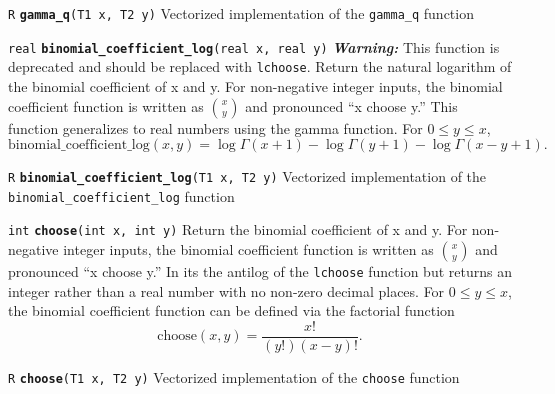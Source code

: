 \documentclass[
  10pt,
]{book}
\begin{document}

\texttt{R} \textbf{\texttt{gamma\_q}}\texttt{(T1\ x,\ T2\ y)}\newline
Vectorized implementation of the \texttt{gamma\_q} function


\texttt{real} \textbf{\texttt{binomial\_coefficient\_log}}\texttt{(real\ x,\ real\ y)}\newline
\emph{\textbf{Warning:}} This function is deprecated and should be replaced with
\texttt{lchoose}. Return the natural logarithm of the binomial coefficient of
x and y. For non-negative integer inputs, the binomial coefficient
function is written as \(\binom{x}{y}\) and pronounced ``x choose y.''
This function generalizes to real numbers using the gamma function.
For \(0 \leq y \leq x\), \[ \mathrm{binomial\_coefficient\_log}(x,y) =
\log\Gamma(x+1) - \log\Gamma(y+1) - \log\Gamma(x-y+1). \]


\texttt{R} \textbf{\texttt{binomial\_coefficient\_log}}\texttt{(T1\ x,\ T2\ y)}\newline
Vectorized implementation of the \texttt{binomial\_coefficient\_log} function


\texttt{int} \textbf{\texttt{choose}}\texttt{(int\ x,\ int\ y)}\newline
Return the binomial coefficient of x and y. For non-negative integer
inputs, the binomial coefficient function is written as \(\binom{x}{y}\)
and pronounced ``x choose y.'' In its the antilog of the \texttt{lchoose}
function but returns an integer rather than a real number with no
non-zero decimal places. For \(0 \leq y \leq x\), the binomial
coefficient function can be defined via the factorial function \[
\text{choose}(x,y) = \frac{x!}{\left(y!\right)\left(x - y\right)!}. \]


\texttt{R} \textbf{\texttt{choose}}\texttt{(T1\ x,\ T2\ y)}\newline
Vectorized implementation of the \texttt{choose} function

\end{document}
